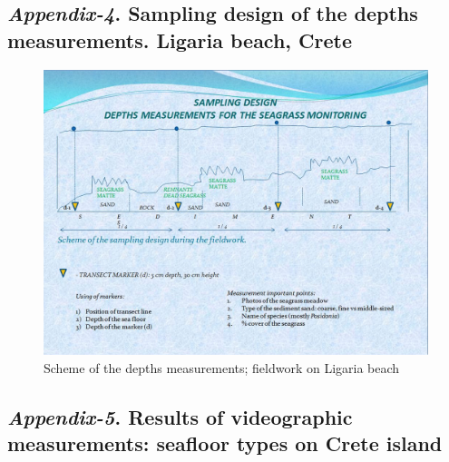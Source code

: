 \documentclass[11pt]{article}
\begin{document}
\begin{appendices}
\subsection{\textit{Appendix-4}. Sampling design of the depths measurements. Ligaria beach, Crete}

\begin{figure}[h]
	\begin{center}
		\includegraphics[scale=0.35]{Sampling_design.jpg}
		\caption{Scheme of the depths measurements; fieldwork on Ligaria beach}\label{fig:A.4}
	\end{center}	
\end{figure}
\pagebreak

\subsection{\textit{Appendix-5}. Results of videographic measurements: seafloor types on Crete island}


\end{appendices}
\end{document}
